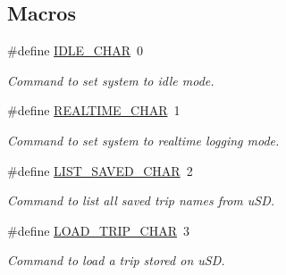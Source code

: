 \subsection*{Macros}
\begin{DoxyCompactItemize}
\item 
\mbox{\label{logging-device_8ino_ad7f0721d7856c100a69be7fa82e2865b}} 
\#define \hyperlink{logging-device_8ino_ad7f0721d7856c100a69be7fa82e2865b}{I\+D\+L\+E\+\_\+\+C\+H\+AR}~\textquotesingle{}0\textquotesingle{}
\begin{DoxyCompactList}\small\item\em Command to set system to idle mode. \end{DoxyCompactList}\item 
\mbox{\label{logging-device_8ino_a911a5839eebf5e3d5927f4f77e9bfb62}} 
\#define \hyperlink{logging-device_8ino_a911a5839eebf5e3d5927f4f77e9bfb62}{R\+E\+A\+L\+T\+I\+M\+E\+\_\+\+C\+H\+AR}~\textquotesingle{}1\textquotesingle{}
\begin{DoxyCompactList}\small\item\em Command to set system to realtime logging mode. \end{DoxyCompactList}\item 
\mbox{\label{logging-device_8ino_a4ffb22b7b0017657087830d24f68a323}} 
\#define \hyperlink{logging-device_8ino_a4ffb22b7b0017657087830d24f68a323}{L\+I\+S\+T\+\_\+\+S\+A\+V\+E\+D\+\_\+\+C\+H\+AR}~\textquotesingle{}2\textquotesingle{}
\begin{DoxyCompactList}\small\item\em Command to list all saved trip names from u\+SD. \end{DoxyCompactList}\item 
\mbox{\label{logging-device_8ino_aa72e33a6bcfedf9118f573741b4e137b}} 
\#define \hyperlink{logging-device_8ino_aa72e33a6bcfedf9118f573741b4e137b}{L\+O\+A\+D\+\_\+\+T\+R\+I\+P\+\_\+\+C\+H\+AR}~\textquotesingle{}3\textquotesingle{}
\begin{DoxyCompactList}\small\item\em Command to load a trip stored on u\+SD. \end{DoxyCompactList}\item 
\mbox{\label{logging-device_8ino_ad1e6e6f6fc813b305067b9e1b0777ea6}} 

\end{DoxyCompactItemize}
